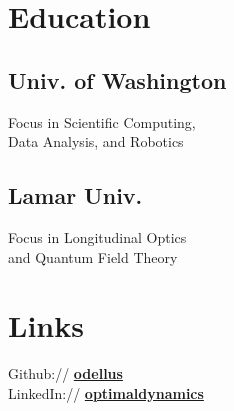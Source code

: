 \documentclass[letterpaper]{deedy-resume} %
\begin{document}
\begin{minipage}[t]{0.33\textwidth} %


\section{Education}

\subsection{Univ. of Washington}

Focus in Scientific Computing, \\
Data Analysis, and Robotics
\sectionspace %
\subsection{Lamar Univ.}
Focus in Longitudinal Optics \\
and Quantum Field Theory

\sectionspace %




\section{Links}

Github:// \href{https://github.com/odellus}{\bf odellus} \\
LinkedIn:// \href{https://www.linkedin.com/in/optimaldynamics}{\bf optimaldynamics} \\


\end{minipage}
\end{document}
